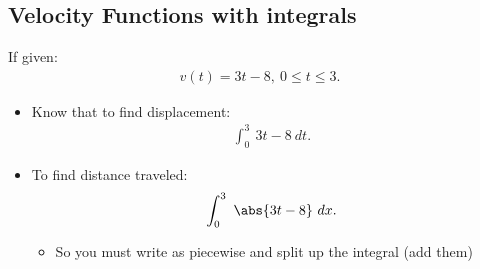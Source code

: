 \documentclass{report}
\begin{document}
      \bigbreak \noindent \bigbreak \noindent
      \subsection{Velocity Functions with integrals}
      \bigbreak \noindent 
      If given:
      \begin{align*}
        v(t) = 3t-8,\ 0 \leq t \leq 3
      .\end{align*}
      \begin{itemize}
        \item Know that to find displacement: 
          \begin{align*}
            \int_{0}^{3}\ 3t-8\ dt
          .\end{align*}
        \item To find distance traveled:
          \begin{align*}
            \int_{0}^{3}\ \abs{3t-8}\ dx
          .\end{align*}
          \begin{itemize}
            \item So you must write as piecewise and split up the integral (add them)
          \end{itemize}
      \end{itemize}

      \pagebreak \bigbreak \noindent
\end{document}
